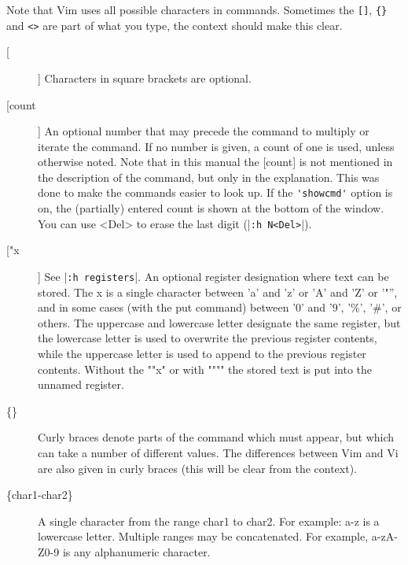 Note that Vim uses all possible characters in commands.
Sometimes the \verb![]!, \verb!{}! and \verb!<>! are part of what you type, the context should make this clear.

\begin{description}
				\item[[]]
								Characters in square brackets are optional.

				\item[[count]]
								\label{count} \label{[count]}
								An optional number that may precede the command to multiply or iterate the command.
								If no number is given, a count of one is used, unless otherwise noted.
								Note that in this manual the [count] is not mentioned in the description of the command, but only in the explanation.
								This was done to make the commands easier to look up.
								If the \verb!'showcmd'! option is on, the (partially) entered count is shown at the bottom of the window.
								You can use <Del> to erase the last digit (|\verb!:h N<Del>!|).

				\item[["x]]
								\label{[quotex]}
								See |\verb!:h registers!|.
								An optional register designation where text can be stored.
								The x is a single character between 'a' and 'z' or 'A' and 'Z' or '"'', and in some cases (with the put command) between '0' and '9', '\%', '\#', or others.
								The uppercase and lowercase letter designate the same register, but the lowercase letter is used to overwrite the previous register contents, while the uppercase letter is used to append to the previous register contents.
								Without the ""x" or with """" the stored text is put into the unnamed register.

				\item[\{\}]
								\label{{}}
								Curly braces denote parts of the command which must appear, but which can take a number of different values.
								The differences between Vim and Vi are also given in curly braces (this will be clear from the context).

				\item[\{char1-char2\}]
								\label{{char1-char2}}
								A single character from the range char1 to char2.
								For example: {a-z} is a lowercase letter.
								Multiple ranges may be concatenated.
								For example, {a-zA-Z0-9} is any alphanumeric character.


\end{description}

